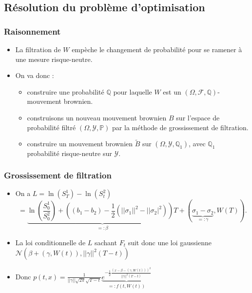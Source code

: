 \documentclass{beamer}
\begin{document}
\subsection{Résolution du problème d'optimisation}
\begin{frame}
\frametitle{Raisonnement}
\begin{itemize}
\item La filtration de $W$ empèche le changement de probabilité pour se ramener à une mesure risque-neutre.
\item On va donc : 
\begin{itemize}
\item construire une probabilité $\mathbb{Q}$ pour laquelle $W$ est un $(\Omega, \mathcal{F}, \mathbb{Q})$-mouvement brownien.
\item construisons un nouveau mouvement brownien $B$ sur l'espace de probabilité filtré  $(\Omega, \mathcal{Y}, \mathbb{P})$ par la méthode de grossissement de filtration.\\
\item construire un mouvement brownien $\tilde{B}$ sur $(\Omega, \mathcal{Y}, \mathbb{Q}_1)$, avec $\mathbb{Q}_1$ probabilité risque-neutre sur $\mathcal{Y}$.
\end{itemize}
\end{itemize} 
\end{frame}


\begin{frame}
\frametitle{Grossissement de filtration}
\begin{itemize}
\item On a $L = \ln(S^1_T) - \ln(S^2_t)$
\begin{equation*}
= \underbrace{\ln ( \frac{S_0^1}{S_0^2} ) + ( ( b_1 - b_2 ) - \frac{1}{2} (||\sigma_1||^2 - ||\sigma_2|^2 ) ) T}_{=: \beta} + ( \underbrace{\sigma_1 - \sigma_2}_{=: \gamma}, W ( T ) ).
\end{equation*}
\item La loi conditionnelle de $L$ sachant $F_t$ suit donc une loi gaussienne $\mathcal{N} \left( \beta + \left( \gamma, W \left( t \right) \right), ||\gamma||^2 \left( T - t \right) \right)$
\item Donc $p \left( t, x \right) = \frac{1}{ ||\gamma|| \sqrt{2 \pi} \sqrt{T - t}} \underbrace{e^{-\frac{1}{2} \frac{\left( x - \beta - \left( \gamma, W \left( t \right) \right) \right)^2}{||\gamma||^2 \left( T - t \right)}}}_{ =: f \left( t, W \left( t \right) \right)}$
\end{itemize}
\end{frame}
\end{document}
